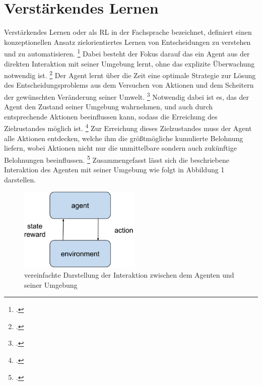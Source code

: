 \section{Verstärkendes Lernen}
Verstärkendes Lernen oder als RL in der Fachsprache bezeichnet, definiert einen konzeptionellen Ansatz zielorientiertes Lernen von Entscheidungen zu verstehen und zu automatisieren. \footcite[Vgl.][S. 13]{Sutton.2018}
Dabei besteht der Fokus darauf das ein Agent aus der direkten Interaktion mit seiner Umgebung lernt, ohne das explizite Überwachung notwendig ist. \footcite[Vgl.][S. 13]{Sutton.2018}
Der Agent lernt über die Zeit eine optimale Strategie zur Lösung des Entscheidungsproblems aus dem Versuchen von Aktionen und dem Scheitern der gewünschten Veränderung seiner Umwelt. \footcite[Vgl.][S. 4]{Li.2019}
Notwendig dabei ist es, das der Agent den Zustand seiner Umgebung wahrnehmen, und auch durch entsprechende Aktionen beeinflussen kann, sodass die Erreichung des Zielzustandes möglich ist. \footcite[Vgl.][S. 2]{Sutton.2018}
Zur Erreichung dieses Zielzustandes muss der Agent alle Aktionen entdecken, welche ihm die größtmögliche kumulierte Belohnung liefern, wobei Aktionen nicht nur die unmittelbare sondern auch zukünftige Belohnungen beeinflussen. \footcite[Vgl.][S. 1]{Sutton.2018}
Zusammengefasst lässt sich die beschriebene Interaktion des Agenten mit seiner Umgebung wie folgt in Abbildung 1 darstellen.
\begin{figure}[htb]
    \centering
    \includegraphics[height=4cm]{lib/graphics/Agent-Environment interaction.png}
    \caption[vereinfachte Darstellung der Interaktion zwischen dem Agenten und seiner Umgebung]{vereinfachte Darstellung der Interaktion zwischen dem Agenten und seiner Umgebung\footnotemark}
    \label{abb:Agent-Environment interaction}
\end{figure}

